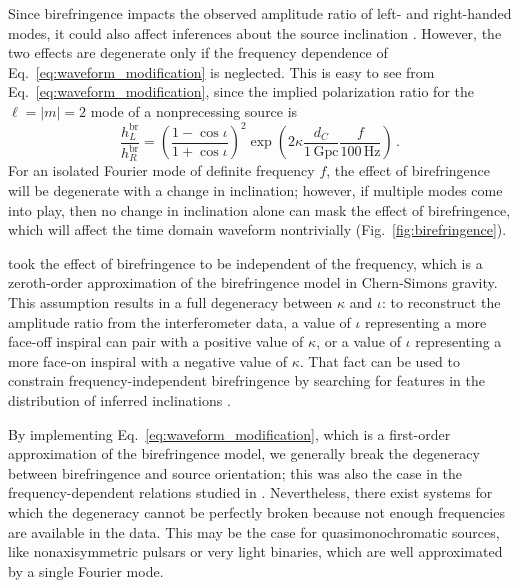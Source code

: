 \documentclass[aps,prd,twocolumn,superscriptaddress,preprintnumbers,floatfix,nofootinbib]{revtex4-2}
\begin{document}
Since birefringence impacts the observed amplitude ratio of left- and right-handed modes, it could also affect inferences about the source inclination \cite{Alexander:2009tp}.
However, the two effects are degenerate only if the frequency dependence of Eq.~\eqref{eq:waveform_modification} is neglected.
This is easy to see from Eq.~\eqref{eq:waveform_modification}, since the implied polarization ratio for the $\ell = |m| = 2$ mode of a nonprecessing source is
\begin{equation}
    \frac{h_{L}^\mathrm{br}}{h_{R}^\mathrm{br}}=\left(\frac{1-\cos\iota}{1+\cos\iota}\right)^2
    \exp\left({2\kappa\frac{d_C}{1\, \mathrm{Gpc}}\frac{f}{100\, \mathrm{Hz}}}\right)\, .
    \label{eq:modified_amplitude_ratio}
\end{equation}
For an isolated Fourier mode of definite frequency $f$, the effect of birefringence will be degenerate with a change in inclination; however, if multiple modes come into play, then no change in inclination alone can mask the effect of birefringence, which will affect the time domain waveform nontrivially (Fig.~\ref{fig:birefringence}).

\citet{Okounkova_2022} took the effect of birefringence to be independent of the frequency, which is a zeroth-order approximation of the birefringence model in Chern-Simons gravity.
This assumption results in a full degeneracy between $\kappa$ and $\iota$:
to reconstruct the amplitude ratio from the interferometer data, a value of $\iota$ representing a more face-off inspiral can pair with a positive value of $\kappa$, or a value of $\iota$ representing a more face-on inspiral with a negative value of $\kappa$.
That fact can be used to constrain frequency-independent birefringence by searching for features in the distribution of inferred inclinations \cite{Okounkova_2022}.

By implementing Eq.~\eqref{eq:waveform_modification}, which is a first-order approximation of the birefringence model, we generally break the degeneracy between birefringence and source orientation; this was also the case in the frequency-dependent relations studied in \cite{Yamada_2020,Wang_2021}.
Nevertheless, there exist systems for which the degeneracy cannot be perfectly broken because not enough frequencies are available in the data.
This may be the case for quasimonochromatic sources, like nonaxisymmetric pulsars or very light binaries, which are well approximated by a single Fourier mode.
\end{document}
